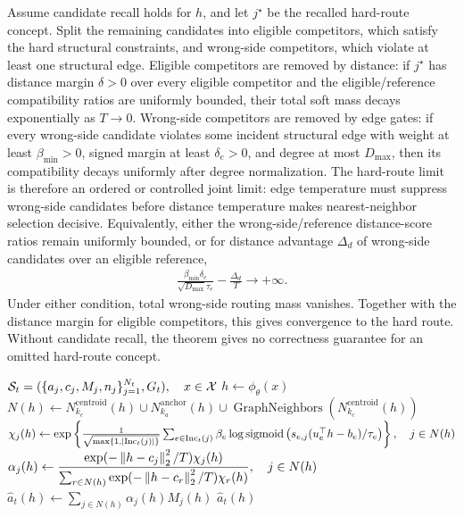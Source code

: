 \begin{theorem}
\label{thm:soft-routing-hard-limit:informal}
Assume candidate recall holds for $h$, and let $j^\star$ be the recalled hard-route concept. Split the remaining candidates into eligible competitors, which satisfy the hard structural constraints, and wrong-side competitors, which violate at least one structural edge. Eligible competitors are removed by distance: if $j^\star$ has distance margin $\delta>0$ over every eligible competitor and the eligible/reference compatibility ratios are uniformly bounded, their total soft mass decays exponentially as $T\to0$. Wrong-side competitors are removed by edge gates: if every wrong-side candidate violates some incident structural edge with weight at least $\beta_{\min}>0$, signed margin at least $\delta_e>0$, and degree at most $D_{\max}$, then its compatibility decays uniformly after degree normalization. The hard-route limit is therefore an ordered or controlled joint limit: edge temperature must suppress wrong-side candidates before distance temperature makes nearest-neighbor selection decisive. Equivalently, either the wrong-side/reference distance-score ratios remain uniformly bounded, or for distance advantage $\Delta_d$ of wrong-side candidates over an eligible reference,
\begin{align*}
\frac{\beta_{\min}\delta_e}{\sqrt{D_{\max}}\tau_e}-\frac{\Delta_d}{T}\to+\infty.
\end{align*}
Under either condition, total wrong-side routing mass vanishes. Together with the distance margin for eligible competitors, this gives convergence to the hard route. Without candidate recall, the theorem gives no correctness guarantee for an omitted hard-route concept.
\end{theorem}

\begin{algorithm}[H]
\caption{\textsc{CA-Predict}}
\label{alg:dgm-predict}
\begin{algorithmic}[1]
\Statex $\mathcal{S}_t=(\{a_j,c_j,M_j,n_j\}_{j=1}^{N_t},G_t),\quad x\in\mathcal{X}$
\State $h\gets\phi_\theta(x)$
\State $N(h)\gets N_{k_c}^{\mathrm{centroid}}(h)\cup N_{k_a}^{\mathrm{anchor}}(h)\cup\operatorname{GraphNeighbors}(N_{k_c}^{\mathrm{centroid}}(h))$
\State $\chi_j(h)\gets
\exp\left\{
\frac{1}{\sqrt{\max\{1,\left\lvert\operatorname{Inc}_t(j)\right\rvert\}}}
\sum_{e\in \operatorname{Inc}_t(j)}
\beta_e\log \operatorname{sigmoid}\left(s_{e,j}(u_e^\top h-b_e)/\tau_e\right)
\right\},\quad j\in N(h)$
\State $\alpha_j(h)\gets
\dfrac{\exp(-\left\lVert h-c_j\right\rVert_2^2/T)\chi_j(h)}
{\sum_{r\in N(h)}\exp(-\left\lVert h-c_r\right\rVert_2^2/T)\chi_r(h)},
\quad j\in N(h)$
\State $\hat a_t(h)\gets\sum_{j\in N(h)}\alpha_j(h)M_j(h)$
\State \Return $\hat a_t(h)$
\end{algorithmic}
\end{algorithm}

